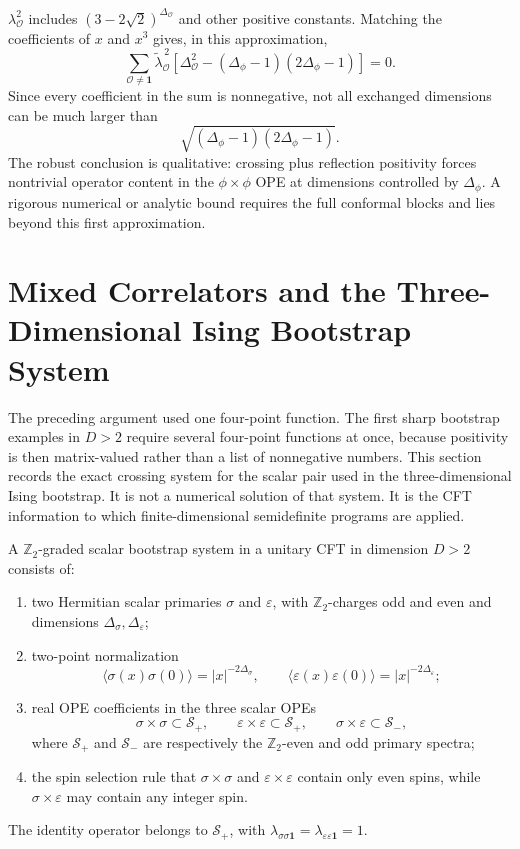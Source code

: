 \(\lambda_{\mathcal O}^2\) includes
\((3-2\sqrt2)^{\Delta_{\mathcal O}}\) and other positive constants.  Matching
the coefficients of \(x\) and \(x^3\) gives, in this approximation,
\[
  \sum_{\mathcal O\ne\mathbf1}
  \widetilde\lambda_{\mathcal O}^{\,2}
  \left[
    \Delta_{\mathcal O}^2
    -
    (\Delta_\phi-1)(2\Delta_\phi-1)
  \right]
  =
  0.
\]
Since every coefficient in the sum is nonnegative, not all exchanged
dimensions can be much larger than
\[
  \sqrt{(\Delta_\phi-1)(2\Delta_\phi-1)}.
\]
The robust conclusion is qualitative: crossing plus reflection positivity
forces nontrivial operator content in the \(\phi\times\phi\) OPE at dimensions
controlled by \(\Delta_\phi\).  A rigorous numerical or analytic bound
requires the full conformal blocks and lies beyond this first approximation.

\section{Mixed Correlators and the Three-Dimensional Ising Bootstrap System}
\label{sec:ising-mixed-correlator-bootstrap-system}

The preceding argument used one four-point function.  The first sharp
bootstrap examples in \(D>2\) require several four-point functions at once,
because positivity is then matrix-valued rather than a list of nonnegative
numbers.  This section records the exact crossing system for the scalar pair
used in the three-dimensional Ising bootstrap.  It is not a numerical
solution of that system.  It is the CFT information to which finite-dimensional
semidefinite programs are applied.

\begin{definition}
\label{def:z2-scalar-bootstrap-system}
A \(\mathbb Z_2\)-graded scalar bootstrap system in a unitary CFT in
dimension \(D>2\) consists of:
\begin{enumerate}
  \item two Hermitian scalar primaries \(\sigma\) and \(\varepsilon\), with
  \(\mathbb Z_2\)-charges odd and even and dimensions
  \(\Delta_\sigma,\Delta_\varepsilon\);
  \item two-point normalization
  \[
    \langle \sigma(x)\sigma(0)\rangle=|x|^{-2\Delta_\sigma},
    \qquad
    \langle \varepsilon(x)\varepsilon(0)\rangle=|x|^{-2\Delta_\varepsilon};
  \]
  \item real OPE coefficients in the three scalar OPEs
  \[
    \sigma\times\sigma\subset \mathcal S_+,\qquad
    \varepsilon\times\varepsilon\subset \mathcal S_+,\qquad
    \sigma\times\varepsilon\subset \mathcal S_-,
  \]
  where \(\mathcal S_+\) and \(\mathcal S_-\) are respectively the
  \(\mathbb Z_2\)-even and odd primary spectra;
  \item the spin selection rule that \(\sigma\times\sigma\) and
  \(\varepsilon\times\varepsilon\) contain only even spins, while
  \(\sigma\times\varepsilon\) may contain any integer spin.
\end{enumerate}
The identity operator belongs to \(\mathcal S_+\), with
\(\lambda_{\sigma\sigma\mathbf 1}=
\lambda_{\varepsilon\varepsilon\mathbf 1}=1\).
\end{definition}


